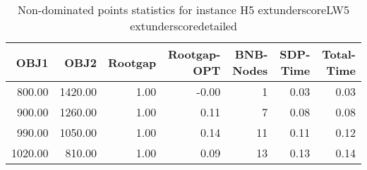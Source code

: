 \begin{table}
\caption{Non-dominated points statistics for instance H5	extunderscoreLW5	extunderscoredetailed}
\label{tab:plots/H5_LW5_detailed}
\begin{tabular}{rrrrrrr}
\toprule
OBJ1 & OBJ2 & Rootgap & Rootgap-OPT & BNB-Nodes & SDP-Time & Total-Time \\
\midrule
800.00 & 1420.00 & 1.00 & -0.00 & 1 & 0.03 & 0.03 \\
900.00 & 1260.00 & 1.00 & 0.11 & 7 & 0.08 & 0.08 \\
990.00 & 1050.00 & 1.00 & 0.14 & 11 & 0.11 & 0.12 \\
1020.00 & 810.00 & 1.00 & 0.09 & 13 & 0.13 & 0.14 \\
\bottomrule
\end{tabular}
\end{table}
